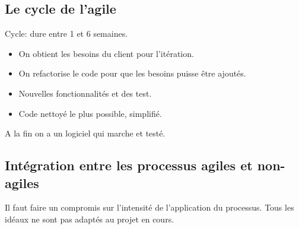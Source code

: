 \subsection{Le cycle de l'agile}
Cycle: dure entre 1 et 6 semaines.
\begin{itemize}
	\item On obtient les besoins du client pour l’itération.
	\item On refactorise le code pour que les besoins puisse être ajoutés.
	\item Nouvelles fonctionnalités et des test.
	\item Code nettoyé le plus possible, simplifié.
\end{itemize}
A la fin on a un logiciel qui marche et testé.



\subsection{Intégration entre les processus agiles et non-agiles}
Il faut faire un compromis sur l’intensité de l’application du processus. Tous les idéaux ne sont pas adaptés au projet en cours.